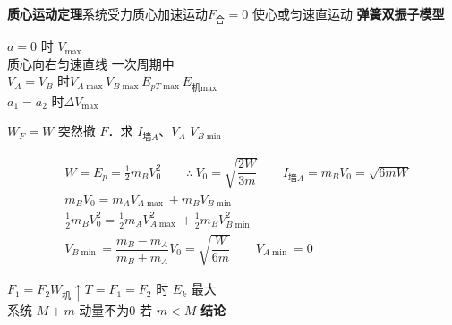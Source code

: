 \textbf{质心运动定理}\quad 系统受力\quad 质心加速运动\quad $F_{\text{合}}=0$ 使心或匀速直运动
\textbf{弹簧双振子模型}

$a=0$ 时 $V_{\max}$\\
质心向右匀速直线
一次周期中\\
$V_A=V_B$ 时\quad $V_{A\max}$\quad $V_{B\max}$\quad $E_{pT\max}$\quad $E_{\text{机}\max}$\\
$a_1=a_2$ 时\quad $\Delta V_{\max}$
\begin{problem}
$W_F=W$ 突然撤 $F$．求 $I_{\text{墙}A}$、$V_A$ $V_{B\min}$
\begin{solution}
\begin{align*}
&W=E_p=\tfrac12 m_BV_0^2\qquad\therefore\ V_0=\sqrt{\dfrac{2W}{3m}}\qquad I_{\text{墙}A}=m_BV_0=\sqrt{6mW}\\
&m_BV_0=m_AV_{A\max}+m_BV_{B\min}\\
&\tfrac12 m_BV_0^2=\tfrac12 m_AV_{A\max}^2+\tfrac12 m_BV_{B\min}^2\\
&V_{B\min}=\dfrac{m_B-m_A}{m_B+m_A}V_0=\sqrt{\dfrac{W}{6m}}\qquad V_{A\min}=0
\end{align*}
\end{solution}
\end{problem}
$F_1=F_2$\quad $W_{\text{机}}\uparrow$\quad $T=F_1=F_2$ 时 $E_k$ 最大\\
系统 $M+m$ 动量不为0
若 $m<M$
\textbf{结论}

